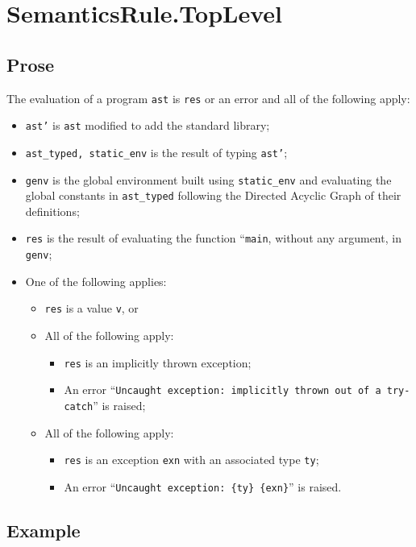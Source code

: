 \documentclass{book}
\begin{document}
  \section{SemanticsRule.TopLevel \label{sec:SemanticsRule.TopLevel}}

  \subsection{Prose}
  The evaluation of a program \texttt{ast} is \texttt{res} or an error
  and all of the following apply:
  \begin{itemize}
  \item \texttt{ast’} is \texttt{ast} modified to add the standard library;
  \item \texttt{ast\_typed, static\_env} is the result of typing \texttt{ast’};
  \item \texttt{genv} is the global environment built using \texttt{static\_env} and evaluating the global constants in \texttt{ast\_typed} following the Directed Acyclic Graph of their definitions;
  \item \texttt{res} is the result of evaluating the function ``\texttt{main}, without any argument, in \texttt{genv};
  \item One of the following applies:
        \begin{itemize}
	\item \texttt{res} is a value \texttt{v}, or
	\item All of the following apply:
              \begin{itemize}
              \item \texttt{res} is an implicitly thrown exception;
	      \item An error ``\texttt{Uncaught exception: implicitly thrown out of a try-catch}'' is raised;
              \end{itemize}
	\item All of the following apply:
              \begin{itemize}
              \item \texttt{res} is an exception \texttt{exn} with an associated type \texttt{ty};
	      \item An error ``\texttt{Uncaught exception: \{ty\} \{exn\}}'' is raised.
              \end{itemize}
        \end{itemize}
  \end{itemize}

  \subsection{Example}
\end{document}
